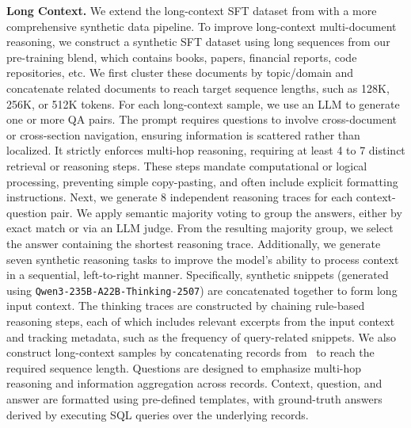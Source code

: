 \textbf{Long Context.}
We extend the long-context SFT dataset from \nanomodel with a more comprehensive synthetic data pipeline. To improve long-context multi-document reasoning, we construct a synthetic SFT dataset using long sequences from our pre-training blend, which contains books, papers, financial reports, code repositories, etc. We first cluster these documents by topic/domain and concatenate related documents to reach target sequence lengths, such as 128K, 256K, or 512K tokens. 
For each long-context sample, we use an LLM to generate one or more QA pairs. The prompt requires questions to involve cross-document or cross-section navigation, ensuring information is scattered rather than localized. It strictly enforces multi-hop reasoning, requiring at least 4 to 7 distinct retrieval or reasoning steps. These steps mandate computational or logical processing, preventing simple copy-pasting, and often include explicit formatting instructions. Next, we generate 8 independent reasoning traces for each context-question pair. We apply semantic majority voting to group the answers, either by exact match or via an LLM judge. From the resulting majority group, we select the answer containing the shortest reasoning trace. 
Additionally, we generate seven synthetic reasoning tasks to improve the model's ability to process context in a sequential, left-to-right manner. Specifically, synthetic snippets (generated using \texttt{Qwen3-235B-A22B-Thinking-2507}) are concatenated together to form long input context. The thinking traces are constructed by chaining rule-based reasoning steps, each of which includes relevant excerpts from the input context and tracking metadata, such as the frequency of query-related snippets.
We also construct long-context samples by concatenating records from~\citep{nvidia/Nemotron-Personas-USA} to reach the required sequence length. Questions are designed to emphasize multi-hop reasoning and information aggregation across records. Context, question, and answer are formatted using pre-defined templates, with ground-truth answers derived by executing SQL queries over the underlying records.

